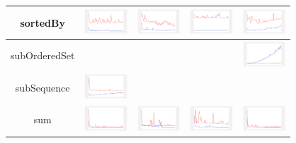 \begin{longtable}{ c|c c c c}
sortedBy
&
\includegraphics[width=1.6cm]{graphs/sequence/small/sortedBy}
&
\includegraphics[width=1.6cm]{graphs/set/small/sortedBy}
&
\includegraphics[width=1.6cm]{graphs/bag/small/sortedBy}
&
\includegraphics[width=1.6cm]{graphs/orderedset/small/sortedBy}
\\\hline

subOrderedSet 
&
&
&
&
\includegraphics[width=1.6cm]{graphs/orderedset/small/Suborderedset}
\\\hline

subSequence
&
\includegraphics[width=1.6cm]{graphs/sequence/small/SubSequence}
&
&
&
\\\hline

sum
&
\includegraphics[width=1.6cm]{graphs/sequence/small/Sum}
&
\includegraphics[width=1.6cm]{graphs/set/small/Sum}
&
\includegraphics[width=1.6cm]{graphs/bag/small/Sum}
&
\includegraphics[width=1.6cm]{graphs/orderedset/small/Sum}
\\\hline


\end{longtable}
